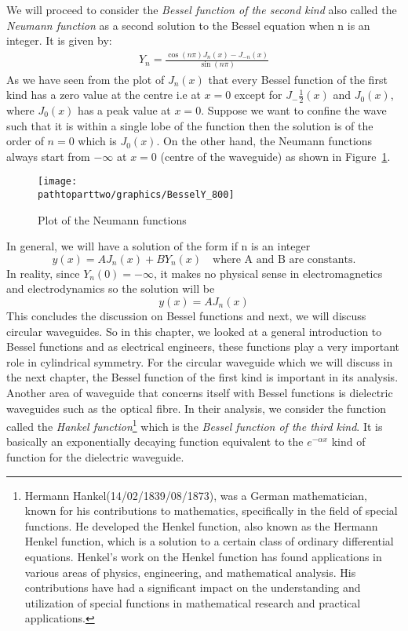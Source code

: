 We will proceed to consider the \emph{Bessel function of the second kind} also called the \emph{Neumann function} as a second solution to the Bessel equation when n is an integer. It is given by: 
\begin{align}
Y_n = \frac{\cos(n\pi) J_n(x) - J_{-n}(x)}{\sin(n\pi)}
\label{eqn:neumannfunctions}
\end{align}
As we have seen from the plot of $J_n(x)$ that every Bessel function of the first kind has a zero value at the centre i.e at $x= 0$ except for $J_-{\frac{1}{2}}(x)$ and $J_0(x)$, where $J_0(x)$ has a peak value at $ x= 0$. Suppose we want to confine the wave such that it is within a single lobe of the function then the solution is of the order of $n =0$ which is $J_0(x)$. On the other hand, the Neumann functions always start from $-\infty$ at $x=0$ (centre of the waveguide) as shown in Figure~\ref{fig:fig-3}.
\begin{figure}[h]
\centering
\texttt{[image: \\pathtoparttwo/graphics/BesselY\_800]}
\caption{ Plot of the Neumann functions}
\label{fig:fig-3}
\end{figure}

In general, we will have a solution of the form if n is an integer
\begin{equation*}
y(x) = AJ_n(x) + B Y_n(x)\quad\text{where A and B are constants.}
\end{equation*}
In reality, since $Y_n(0) = -\infty$, it makes no physical sense in electromagnetics and electrodynamics so the solution will be 
\begin{equation}
y(x) = AJ_n(x)
\end{equation}
This concludes the discussion on Bessel functions and next, we will discuss circular waveguides. So in this chapter, we looked at a general introduction to Bessel functions and as electrical engineers, these functions play a very important role in cylindrical symmetry. For the circular waveguide which we will discuss in the next chapter, the Bessel function of the first kind is important in its analysis. Another area of waveguide that concerns itself with Bessel functions is dielectric waveguides such as the optical fibre. In their analysis, we consider the function called the \emph{Hankel function}\footnote{
Hermann Hankel(14/02/1839/08/1873), was a German mathematician, known for his contributions to mathematics, specifically in the field of special functions. He developed the Henkel function, also known as the Hermann Henkel function, which is a solution to a certain class of ordinary differential equations. Henkel's work on the Henkel function has found applications in various areas of physics, engineering, and mathematical analysis. His contributions have had a significant impact on the understanding and utilization of special functions in mathematical research and practical applications.
} which is the \emph{Bessel function of the third kind}. It is basically an exponentially decaying function equivalent to the $e^{-\alpha x}$ kind of function for the dielectric waveguide.

